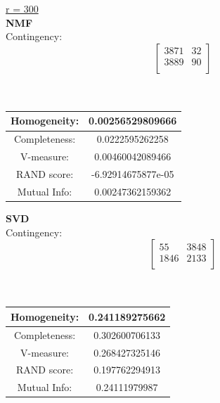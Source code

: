 \documentclass{report}
\begin{document}
\underline{r = 300} \\
\textbf{NMF} \\
Contingency: \[
\begin{bmatrix} 
3871   		& 32 \\
3889   		& 90 \\ 
\end{bmatrix}
\]
\\ \\


\begin{center}
\begin{tabu}{| c | c |}
\hline
Homogeneity: 		& 0.00256529809666 \\ 
\hline
Completeness: 		& 0.0222595262258 \\
\hline
V-measure: 			& 0.00460042089466 \\
\hline
RAND score: 		& -6.92914675877e-05 \\
\hline
Mutual Info: 		& 0.00247362159362 \\
\hline
\end{tabu}
\end{center}

\textbf{SVD} \\
Contingency: \[
\begin{bmatrix}
55 		& 3848 \\
1846 	& 2133 \\
\end{bmatrix}
\]
\\ \\


\begin{center}
\begin{tabu}{| c | c |}
\hline
Homogeneity: 		& 0.241189275662 \\
\hline
Completeness: 		& 0.302600706133 \\
\hline
V-measure: 			& 0.268427325146 \\
\hline
RAND score: 		& 0.197762294913 \\ 
\hline
Mutual Info: 		& 0.24111979987 \\
\hline
\end{tabu}
\end{center}
\end{document}
